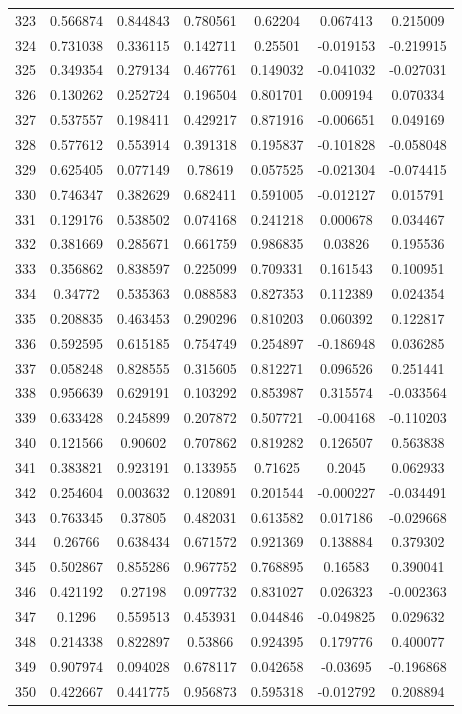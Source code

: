 \begin{table}
\begin{tabular}{c|c|c|c|c|c|c}
323 & 0.566874 & 0.844843 & 0.780561 & 0.62204 & 0.067413 & 0.215009\\
324 & 0.731038 & 0.336115 & 0.142711 & 0.25501 & -0.019153 & -0.219915\\
325 & 0.349354 & 0.279134 & 0.467761 & 0.149032 & -0.041032 & -0.027031\\
326 & 0.130262 & 0.252724 & 0.196504 & 0.801701 & 0.009194 & 0.070334\\
327 & 0.537557 & 0.198411 & 0.429217 & 0.871916 & -0.006651 & 0.049169\\
328 & 0.577612 & 0.553914 & 0.391318 & 0.195837 & -0.101828 & -0.058048\\
329 & 0.625405 & 0.077149 & 0.78619 & 0.057525 & -0.021304 & -0.074415\\
330 & 0.746347 & 0.382629 & 0.682411 & 0.591005 & -0.012127 & 0.015791\\
331 & 0.129176 & 0.538502 & 0.074168 & 0.241218 & 0.000678 & 0.034467\\
332 & 0.381669 & 0.285671 & 0.661759 & 0.986835 & 0.03826 & 0.195536\\
333 & 0.356862 & 0.838597 & 0.225099 & 0.709331 & 0.161543 & 0.100951\\
334 & 0.34772 & 0.535363 & 0.088583 & 0.827353 & 0.112389 & 0.024354\\
335 & 0.208835 & 0.463453 & 0.290296 & 0.810203 & 0.060392 & 0.122817\\
336 & 0.592595 & 0.615185 & 0.754749 & 0.254897 & -0.186948 & 0.036285\\
337 & 0.058248 & 0.828555 & 0.315605 & 0.812271 & 0.096526 & 0.251441\\
338 & 0.956639 & 0.629191 & 0.103292 & 0.853987 & 0.315574 & -0.033564\\
339 & 0.633428 & 0.245899 & 0.207872 & 0.507721 & -0.004168 & -0.110203\\
340 & 0.121566 & 0.90602 & 0.707862 & 0.819282 & 0.126507 & 0.563838\\
341 & 0.383821 & 0.923191 & 0.133955 & 0.71625 & 0.2045 & 0.062933\\
342 & 0.254604 & 0.003632 & 0.120891 & 0.201544 & -0.000227 & -0.034491\\
343 & 0.763345 & 0.37805 & 0.482031 & 0.613582 & 0.017186 & -0.029668\\
344 & 0.26766 & 0.638434 & 0.671572 & 0.921369 & 0.138884 & 0.379302\\
345 & 0.502867 & 0.855286 & 0.967752 & 0.768895 & 0.16583 & 0.390041\\
346 & 0.421192 & 0.27198 & 0.097732 & 0.831027 & 0.026323 & -0.002363\\
347 & 0.1296 & 0.559513 & 0.453931 & 0.044846 & -0.049825 & 0.029632\\
348 & 0.214338 & 0.822897 & 0.53866 & 0.924395 & 0.179776 & 0.400077\\
349 & 0.907974 & 0.094028 & 0.678117 & 0.042658 & -0.03695 & -0.196868\\
350 & 0.422667 & 0.441775 & 0.956873 & 0.595318 & -0.012792 & 0.208894\\
\end{tabular}
\end{table}
